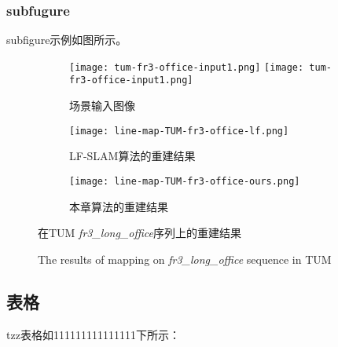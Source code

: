 \subsubsection{subfugure}
subfigure示例如图所示。

\begin{figure}[htb]
	\centering
    \begin{subfigure}[b]{0.8\textwidth}
		\centering
        \texttt{[image: tum-fr3-office-input1.png]} %
        \texttt{[image: tum-fr3-office-input1.png]}
        \caption{场景输入图像}
    \end{subfigure}
    \vspace{0.3cm}
    \begin{subfigure}[b]{0.45\textwidth}
        \centering
        \texttt{[image: line-map-TUM-fr3-office-lf.png]}
        \caption{LF-SLAM算法的重建结果}
    \end{subfigure}
    \vspace{0.2cm}
    \begin{subfigure}[b]{0.45\textwidth}
        \centering
        \texttt{[image: line-map-TUM-fr3-office-ours.png]}
        \caption{本章算法的重建结果}
    \end{subfigure}
    \vspace{0.2cm}
	\caption{在TUM {\itshape fr3\_long\_office}序列上的重建结果}
    \label{fig:line_optim:map}
    \addtocounter{figure}{-1}
    \renewcommand{\figurename}{Fig.}
    \caption{The results of mapping on {\itshape fr3\_long\_office} sequence in TUM}
\end{figure}

\subsection{表格}

tzz表格如111111111111111下所示：

